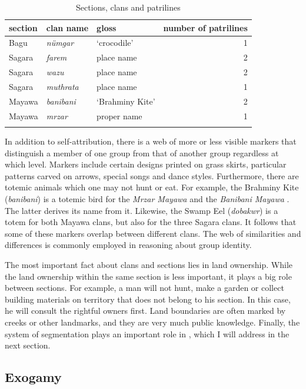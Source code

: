 \begin{table}
\caption{Sections, clans and patrilines}
\label{peopleseg}
	\begin{tabularx}{\textwidth}{XXXr}
		\lsptoprule
			section&clan name&gloss&number of patrilines\\\midrule
			Bagu&\emph{nümgar}&`crocodile'&1\\
			Sagara&\emph{farem}&place name&2\\
			Sagara&\emph{wazu}&place name&2\\
			Sagara&\emph{muthrata}&place name&1\\
			Mayawa&\emph{banibani}&`Brahminy Kite'&2\\
			Mayawa&\emph{mrzar}&proper name&1\\
		\lspbottomrule
	\end{tabularx}
\end{table}%

In addition to self-attribution, there is a web of more or less visible markers that distinguish a member of one group from that of another group regardless at which level. Markers include certain designs printed on grass skirts, particular patterns carved on arrows, special songs and dance styles. Furthermore, there are totemic animals which one may not hunt or eat. For example, the Brahminy Kite (\emph{banibani}) is a totemic bird for the \emph{Mrzar Mayawa}  and the \emph{Banibani Mayawa} . The latter derives its name from it. Likewise, the Swamp Eel (\emph{dobakwr}) is a totem for both Mayawa clans, but also for the three Sagara clans. It follows that some of these markers overlap between different clans. The web of similarities and differences is commonly employed in reasoning about group identity.

The most important fact about clans and sections lies in land ownership. While the land ownership within the same section is less important, it plays a big role between sections. For example, a man will not hunt, make a garden or collect building materials on territory that does not belong to his section. In this case, he will consult the rightful owners first. Land boundaries are often marked by creeks or other landmarks, and they are very much public knowledge. Finally, the system of segmentation plays an important role in , which I will address in the next section.

\subsection{Exogamy}\label{exogamy}

